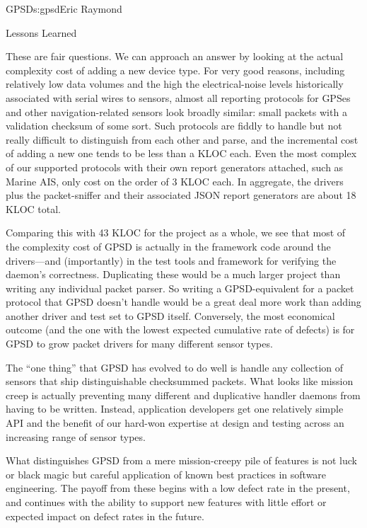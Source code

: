\begin{aosachapter}{GPSD}{s:gpsd}{Eric Raymond}
\begin{aosasect1}{Lessons Learned}

These are fair questions. We can approach an answer by looking at the
actual complexity cost of adding a new device type.  For very good
reasons, including relatively low data volumes and the high the
electrical-noise levels historically associated with serial wires to
sensors, almost all reporting protocols for GPSes and other
navigation-related sensors look broadly similar: small packets with a
validation checksum of some sort.  Such protocols are fiddly to handle
but not really difficult to distinguish from each other and parse, and
the incremental cost of adding a new one tends to be less than a KLOC
each. Even the most complex of our supported protocols with their own
report generators attached, such as Marine AIS, only cost on the order
of 3 KLOC each. In aggregate, the drivers plus the packet-sniffer and
their associated JSON report generators are about 18 KLOC total.

Comparing this with 43 KLOC for the project as a whole, we see that
most of the complexity cost of GPSD is actually in the framework code
around the drivers---and (importantly) in the test tools and framework
for verifying the daemon's correctness.  Duplicating these would be a
much larger project than writing any individual packet parser.  So
writing a GPSD-equivalent for a packet protocol that GPSD doesn't
handle would be a great deal more work than adding another driver and
test set to GPSD itself.  Conversely, the most economical outcome (and
the one with the lowest expected cumulative rate of defects) is for
GPSD to grow packet drivers for many different sensor types.

The ``one thing'' that GPSD has evolved to do well is handle any
collection of sensors that ship distinguishable checksummed packets.
What looks like mission creep is actually preventing many different
and duplicative handler daemons from having to be written.  Instead,
application developers get one relatively simple API and the benefit
of our hard-won expertise at design and testing across an increasing
range of sensor types.


What distinguishes GPSD from a mere mission-creepy pile of features is
not luck or black magic but careful application of known best
practices in software engineering.  The payoff from these begins with
a low defect rate in the present, and continues with the ability to
support new features with little effort or expected impact on defect
rates in the future.


\end{aosasect1}
\end{aosachapter}
